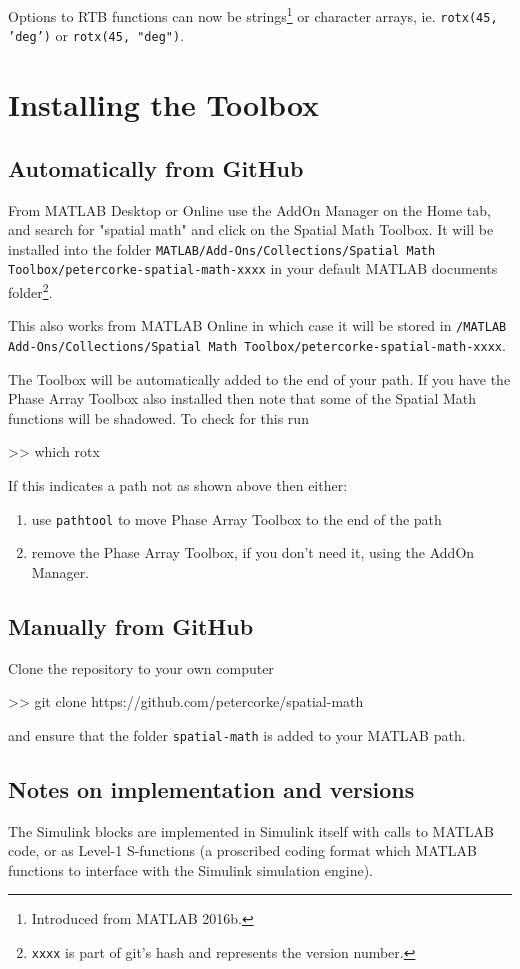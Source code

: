 \documentclass[a4paper,twoside]{report}
\begin{document}
Options to RTB functions can now be strings\footnote{Introduced from MATLAB 2016b.} or character arrays, ie. \texttt{rotx(45, 'deg')} or \texttt{rotx(45, "deg")}.  

\section{Installing the Toolbox}

\subsection{Automatically from GitHub}
From MATLAB Desktop or Online use the AddOn Manager on the Home tab, and search for "spatial math" and click on the Spatial Math Toolbox.
It will be installed into the folder \texttt{MATLAB/Add-Ons/Collections/Spatial Math Toolbox/petercorke-spatial-math-xxxx} in your default MATLAB
documents folder\footnote{\texttt{xxxx} is part of git's hash and represents the version number.}.

This also works from MATLAB Online in which case it will be stored in  \texttt{/MATLAB Add-Ons/Collections/Spatial Math Toolbox/petercorke-spatial-math-xxxx}.

The Toolbox will be automatically added to the end of your path.  If you have the Phase Array Toolbox also installed then note that some of the Spatial Math functions will be shadowed.  To check for this run
\begin{Code}
>> which rotx
\end{Code}
If this indicates a path not as shown above then  either:
\begin{enumerate}
\item use \texttt{pathtool} to move Phase Array Toolbox to the end of the path
\item remove the Phase Array Toolbox, if you don't need it, using the AddOn Manager. 
\end{enumerate}

\subsection{Manually from GitHub}
Clone the repository to your own computer
\begin{Code}
>> git clone https://github.com/petercorke/spatial-math
\end{Code}
and ensure that the folder \texttt{spatial-math} is added to your MATLAB path.


\subsection{Notes on implementation and versions}
The Simulink blocks are implemented in Simulink itself with calls to MATLAB code, or as Level-1 S-functions (a proscribed coding format which MATLAB functions
to  interface with the Simulink simulation engine).
\end{document}
